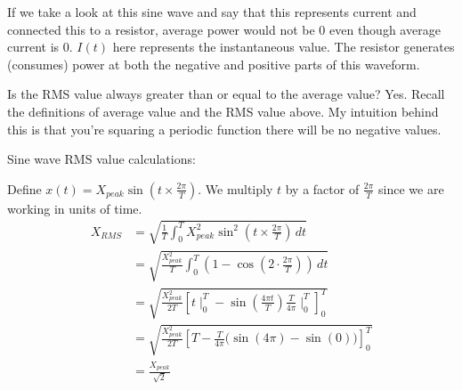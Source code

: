 If we take a look at this sine wave and say that this represents current and connected this to a resistor, average power would not be 0 even though average current is 0. $I(t)$ here represents the instantaneous value. The resistor generates (consumes) power at both the negative and positive parts of this waveform.
\begin{center}
\end{center}

\begin{sanity}
    Is the RMS value always greater than or equal to the average value? Yes. Recall the definitions of average value and the RMS value above. My intuition behind this is that you're squaring a periodic function there will be no negative values.
\end{sanity}

Sine wave RMS value calculations:

Define $x(t) = X_{peak} \sin{(t \times \frac{2\pi}{T})}$. We multiply $t$ by a factor of $\frac{2\pi}{T}$ since we are working in units of time.
\begin{align*} 
    X_{RMS} &= \sqrt{\frac{1}{T} \int_0^T X_{peak}^2 \sin^2{(t \times \frac{2\pi}{T})} \,dt} \tag{1} \\
    &= \sqrt{\frac{X_{peak}^2}{T} \int_0^T (1-\cos{(2\cdot \frac{2\pi}{T})}) \,dt} \tag{2} \\
    &= \sqrt{\frac{X_{peak}^2}{2T} \left[t \mid_0^T - \sin{(\frac{4\pi t}{T})\frac{T}{4\pi} \mid_0^T}\right]_0^T} \tag{3} \\ 
    &= \sqrt{\frac{X_{peak}^2}{2T} \left[T - \frac{T}{4\pi}(\sin{(4\pi) - \sin{(0))}}\right]_0^T} \tag{4} \\
    &= \frac{X_{peak}}{\sqrt{2}} \tag{5}
\end{align*}

